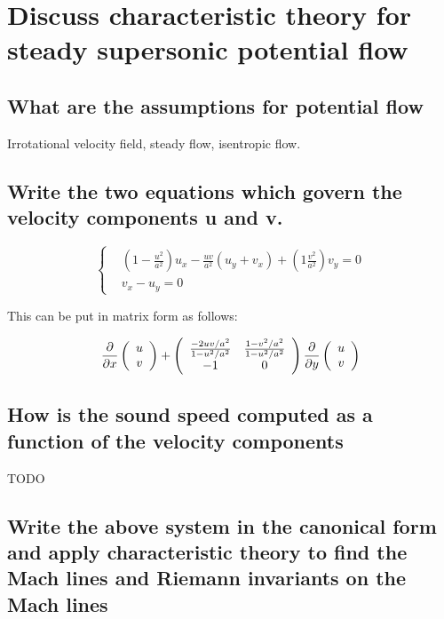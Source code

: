 \documentclass[british,french,11pt, a4paper, openany]{article}
\begin{document}
\section{Discuss characteristic theory for steady supersonic potential flow}
\subsection{What are the assumptions for potential flow}
Irrotational velocity field, steady flow, isentropic flow.

\subsection{Write the two equations which govern the velocity components u and v.}

\begin{equation}
\left\{
\begin{aligned}
&\left( 1 - \frac{u^2}{a^2} \right) u_x - \frac{uv}{a^2} (u_y + v_x) + \left( 1  \frac{v^2}{a^2} \right) v_y = 0\\
& v_x - u_y = 0
\end{aligned}
\right.
\end{equation}

	This can be put in matrix form as follows: 

\begin{equation}
\frac{\partial}{\partial x} 
\left( 
\begin{array}{c}
u\\
v
\end{array}
\right)
+ 
\left( 
\begin{array}{ccc}
\frac{-2uv/a^2}{1-u^2/a^2} & \frac{1-v^2/a^2}{1-u^2/a^2}\\
-1 & 0
\end{array}
\right)
\frac{\partial}{\partial y} 
\left( 
\begin{array}{c}
u\\
v
\end{array}
\right)
\end{equation}

\subsection{How is the sound speed computed as a function of the velocity components}

TODO

\subsection{Write the above system in the canonical form and apply characteristic theory to find the Mach lines and Riemann invariants on the Mach lines}
\end{document}
